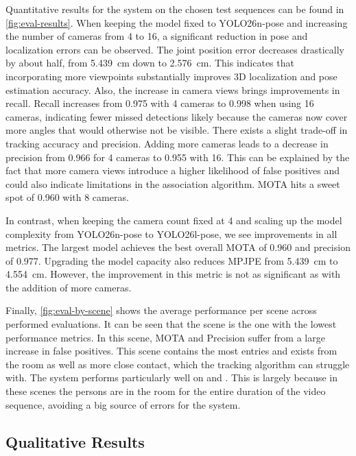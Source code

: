 Quantitative results for the system on the chosen test sequences can be found in \cref{fig:eval-results}. When keeping the model fixed to YOLO26n-pose and increasing the number of cameras from 4 to 16, a significant reduction in pose and localization errors can be observed. The joint position error decreases drastically by about half, from 5.439 cm down to 2.576 cm. This indicates that incorporating more viewpoints substantially improves 3D localization and pose estimation accuracy. Also, the increase in camera views brings improvements in recall. Recall increases from 0.975 with 4 cameras to 0.998 when using 16 cameras, indicating fewer missed detections likely because the cameras now cover more angles that would otherwise not be visible. There exists a slight trade-off in tracking accuracy and precision. Adding more cameras leads to a decrease in precision from 0.966 for 4 cameras to 0.955 with 16. This can be explained by the fact that more camera views introduce a higher likelihood of false positives and could also indicate limitations in the association algorithm. MOTA hits a sweet spot of 0.960 with 8 cameras. 

In contrast, when keeping the camera count fixed at 4 and scaling up the model complexity from YOLO26n-pose to YOLO26l-pose, we see improvements in all metrics. The largest model achieves the best overall MOTA of 0.960 and precision of 0.977. Upgrading the model capacity also reduces MPJPE from 5.439 cm to 4.554 cm. However, the improvement in this metric is not as significant as with the addition of more cameras.

Finally, \cref{fig:eval-by-scene} shows the average performance per scene across performed evaluations. It can be seen that the  scene is the one with the lowest performance metrics. In this scene, MOTA and Precision suffer from a large increase in false positives. This scene contains the most entries and exists from the room as well as more close contact, which the tracking algorithm can struggle with. The system performs particularly well on  and . This is largely because in these scenes the persons are in the room for the entire duration of the video sequence, avoiding a big source of errors for the system.


\subsection{Qualitative Results} \label{qual}

